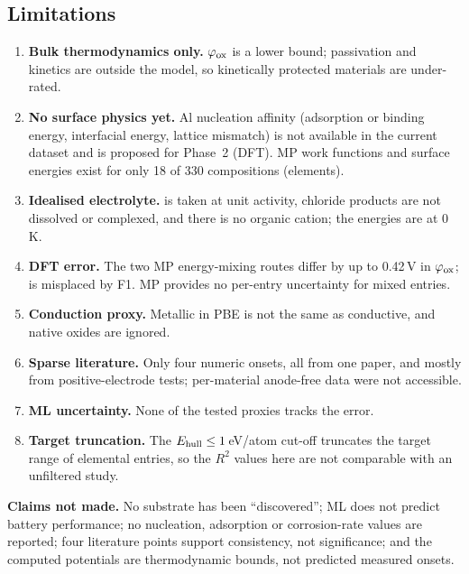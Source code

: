 \subsection{Limitations}
\begin{enumerate}[leftmargin=*,itemsep=2pt]
\item \textbf{Bulk thermodynamics only.} $\varphi_{\mathrm{ox}}$ is a lower bound; passivation and kinetics are outside the model, so kinetically protected materials are under-rated.
\item \textbf{No surface physics yet.} Al nucleation affinity (adsorption or binding energy, interfacial energy, lattice mismatch) is not available in the current dataset and is proposed for Phase~2 (DFT). MP work functions and surface energies exist for only 18 of 330 compositions (elements).
\item \textbf{Idealised electrolyte.}  is taken at unit activity, chloride products are not dissolved or complexed, and there is no organic cation; the energies are at 0\,K.
\item \textbf{DFT error.} The two MP energy-mixing routes differ by up to 0.42\,V in $\varphi_{\mathrm{ox}}$;  is misplaced by F1. MP provides no per-entry uncertainty for mixed entries.
\item \textbf{Conduction proxy.} Metallic in PBE is not the same as conductive, and native oxides are ignored.
\item \textbf{Sparse literature.} Only four numeric onsets, all from one paper, and mostly from positive-electrode tests; per-material anode-free data were not accessible.
\item \textbf{ML uncertainty.} None of the tested proxies tracks the error.
\item \textbf{Target truncation.} The $E_{\mathrm{hull}} \le 1$\,eV/atom cut-off truncates the target range of elemental entries, so the $R^2$ values here are not comparable with an unfiltered study.
\end{enumerate}

\noindent\textbf{Claims not made.} No substrate has been ``discovered''; ML does not predict battery performance; no nucleation, adsorption or corrosion-rate values are reported; four literature points support consistency, not significance; and the computed potentials are thermodynamic bounds, not predicted measured onsets.

